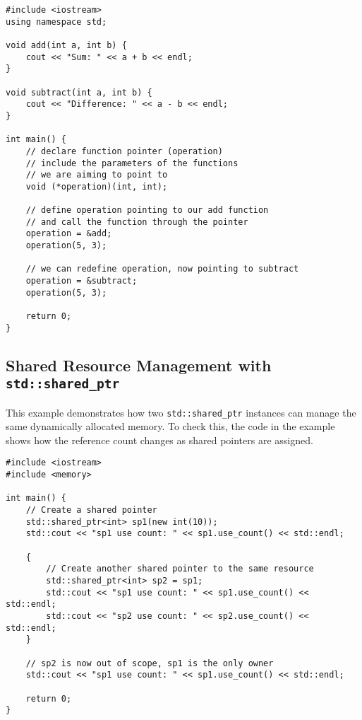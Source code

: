 \documentclass{article}
\begin{document}
\begin{verbatim}
#include <iostream>
using namespace std;

void add(int a, int b) {
    cout << "Sum: " << a + b << endl;
}

void subtract(int a, int b) {
    cout << "Difference: " << a - b << endl;
}

int main() {
    // declare function pointer (operation)
    // include the parameters of the functions
    // we are aiming to point to
    void (*operation)(int, int);

    // define operation pointing to our add function
    // and call the function through the pointer
    operation = &add;
    operation(5, 3);

    // we can redefine operation, now pointing to subtract
    operation = &subtract;
    operation(5, 3);

    return 0;
}
\end{verbatim}

\subsection*{Shared Resource Management with \texttt{std::shared\_ptr}}
This example demonstrates how two \texttt{std::shared\_ptr} instances can manage the same dynamically allocated memory. To check this, the code in the example shows how the reference count changes as shared pointers are assigned.

\begin{verbatim}
#include <iostream>
#include <memory>

int main() {
    // Create a shared pointer
    std::shared_ptr<int> sp1(new int(10));
    std::cout << "sp1 use count: " << sp1.use_count() << std::endl;

    {
        // Create another shared pointer to the same resource
        std::shared_ptr<int> sp2 = sp1;
        std::cout << "sp1 use count: " << sp1.use_count() << std::endl;
        std::cout << "sp2 use count: " << sp2.use_count() << std::endl;
    }

    // sp2 is now out of scope, sp1 is the only owner
    std::cout << "sp1 use count: " << sp1.use_count() << std::endl;

    return 0;
}
\end{verbatim}
\end{document}
